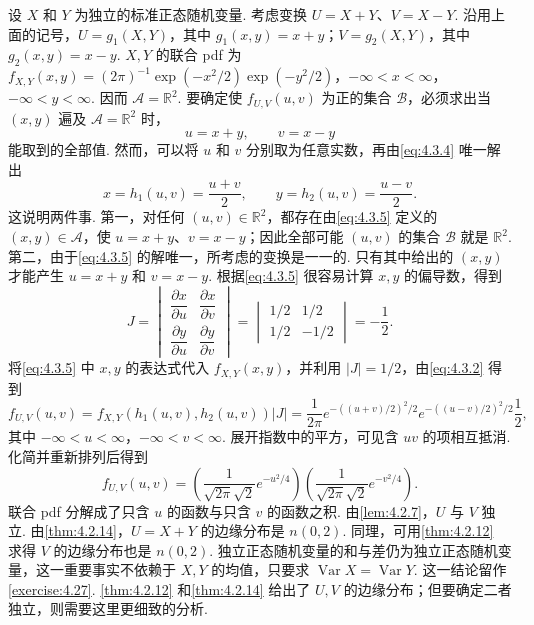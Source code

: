\begin{example}[正态变量的和与差]\label{ex:4.3.4}
设 $X$ 和 $Y$ 为独立的标准正态随机变量. 考虑变换 $U=X+Y$、$V=X-Y$. 沿用上面的记号，$U=g_1(X,Y)$，其中 $g_1(x,y)=x+y$；$V=g_2(X,Y)$，其中 $g_2(x,y)=x-y$. $X,Y$ 的联合 pdf 为 $f_{X,Y}(x,y)=(2\pi)^{-1}\exp(-x^2/2)\exp(-y^2/2)$，$-\infty<x<\infty$，$-\infty<y<\infty$. 因而 $\mathscr A=\mathbb R^2$. 要确定使 $f_{U,V}(u,v)$ 为正的集合 $\mathscr B$，必须求出当 $(x,y)$ 遍及 $\mathscr A=\mathbb R^2$ 时，
\begin{equation}\label{eq:4.3.4}
u=x+y,\qquad v=x-y
\end{equation}
能取到的全部值. 然而，可以将 $u$ 和 $v$ 分别取为任意实数，再由\eqref{eq:4.3.4} 唯一解出
\begin{equation}\label{eq:4.3.5}
x=h_1(u,v)=\frac{u+v}{2},\qquad y=h_2(u,v)=\frac{u-v}{2}.
\end{equation}
这说明两件事. 第一，对任何 $(u,v)\in\mathbb R^2$，都存在由\eqref{eq:4.3.5} 定义的 $(x,y)\in\mathscr A$，使 $u=x+y$、$v=x-y$；因此全部可能 $(u,v)$ 的集合 $\mathscr B$ 就是 $\mathbb R^2$. 第二，由于\eqref{eq:4.3.5} 的解唯一，所考虑的变换是一一的. 只有其中给出的 $(x,y)$ 才能产生 $u=x+y$ 和 $v=x-y$. 根据\eqref{eq:4.3.5} 很容易计算 $x,y$ 的偏导数，得到
$$J=\begin{vmatrix}\dfrac{\partial x}{\partial u}&\dfrac{\partial x}{\partial v}\\[4pt]\dfrac{\partial y}{\partial u}&\dfrac{\partial y}{\partial v}\end{vmatrix}
=\begin{vmatrix}1/2&1/2\\1/2&-1/2\end{vmatrix}=-\frac12.$$
将\eqref{eq:4.3.5} 中 $x,y$ 的表达式代入 $f_{X,Y}(x,y)$，并利用 $|J|=1/2$，由\eqref{eq:4.3.2} 得到
$$f_{U,V}(u,v)=f_{X,Y}(h_1(u,v),h_2(u,v))|J|=\frac1{2\pi}e^{-((u+v)/2)^2/2}e^{-((u-v)/2)^2/2}\frac12,$$
其中 $-\infty<u<\infty$，$-\infty<v<\infty$. 展开指数中的平方，可见含 $uv$ 的项相互抵消. 化简并重新排列后得到
$$f_{U,V}(u,v)=\left(\frac1{\sqrt{2\pi}\sqrt2}e^{-u^2/4}\right)\left(\frac1{\sqrt{2\pi}\sqrt2}e^{-v^2/4}\right).$$
联合 pdf 分解成了只含 $u$ 的函数与只含 $v$ 的函数之积. 由\autoref{lem:4.2.7}，$U$ 与 $V$ 独立. 由\autoref{thm:4.2.14}，$U=X+Y$ 的边缘分布是 $n(0,2)$. 同理，可用\autoref{thm:4.2.12} 求得 $V$ 的边缘分布也是 $n(0,2)$. 独立正态随机变量的和与差仍为独立正态随机变量，这一重要事实不依赖于 $X,Y$ 的均值，只要求 $\operatorname{Var}X=\operatorname{Var}Y$. 这一结论留作\autoref{exercise:4.27}. \autoref{thm:4.2.12} 和\autoref{thm:4.2.14} 给出了 $U,V$ 的边缘分布；但要确定二者独立，则需要这里更细致的分析.
\end{example}

